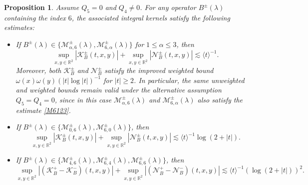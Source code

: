 \documentclass[reqno]{amsart}
\newtheorem{proposition}[theorem]{Proposition}
\numberwithin{equation}{section}
\begin{document}
\begin{proposition}\label{prop_part1}    
	Assume $Q_5 = 0$ and $Q_4 \neq 0$. For any operator $B^\pm(\lambda)$ containing the index $6$, the associated integral kernels satisfy the following estimates:  
	\begin{itemize}
		\item[(i)] If $B^\pm(\lambda) \in \{ \mathcal{M}_{\alpha,6}^{\pm}(\lambda), \mathcal{M}_{6,\alpha}^{\pm}(\lambda) \}$ for $1 \le \alpha \le 3$, then  
		\[
\sup_{x,y\in\mathbb{R}^2}\left|\mathcal{K}_{B}^\pm(t,x,y)\right|
+\sup_{x,y\in\mathbb{R}^2}\left|\mathcal{N}_{B}^\pm(t,x,y)\right|
	\lesssim \langle t\rangle^{-1}.
	\] 
	Moreover,  both $\mathcal{K}_{B}^\pm$ and $\mathcal{N}_{B}^\pm$  satisfy the  improved weighted bound $\omega(x)\omega(y)(|t|\log|t|)^{-1}$ for $|t| \ge 2$.
	In particular, the same unweighted and weighted bounds remain valid under the alternative assumption $Q_5 = Q_4 = 0$, since in this case $\mathcal{M}_{\alpha,6}^{\pm}(\lambda)$ and $\mathcal{M}_{6,\alpha}^{\pm}(\lambda)$ also satisfy the estimate \eqref{M6123}.
		\item[(ii)] If $B^\pm(\lambda) \in \{ \mathcal{M}_{0,6}^{\pm}(\lambda), \mathcal{M}_{6,0}^{\pm}(\lambda) \}$, then
		\[
\sup_{x,y\in\mathbb{R}^2}\left|\mathcal{K}_{B}^\pm(t,x,y)\right|
	+ \sup_{x,y\in\mathbb{R}^2}\left|\mathcal{N}_{B}^\pm(t,x,y)\right|
	\lesssim \langle t\rangle^{-1} \log(2+|t|).
	\]
		\item[(iii)] If $B^\pm(\lambda) \in \{ \mathcal{M}_{4,6}^{\pm}(\lambda), \mathcal{M}_{6,4}^{\pm}(\lambda), \mathcal{M}_{6,6}^{\pm}(\lambda) \}$, then  
		\[
\sup _{x, y \in \mathbb{R}^2}\left|\left(\mathcal{K}_{B}^+-\mathcal{K}_{B}^-\right)(t,x,y)\right| +
	\sup _{x, y \in \mathbb{R}^2}\left|\left(\mathcal{N}_{B}^+-\mathcal{N}_{B}^-\right)(t,x,y)\right|
	\lesssim \langle t\rangle^{-1} (\log(2+|t|))^{2}.
	\]
	\end{itemize}  
\end{proposition}   
\end{document}
